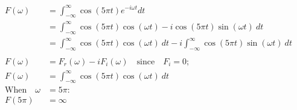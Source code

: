 \documentclass[preview]{standalone}
\begin{document}
\begin{align*}
F(\omega)&= \int_{-\infty}^{\infty} \cos{(5\pi t)}e^{-i\omega t} dt \\ &= \int_{-\infty}^{\infty} \cos{(5\pi t)}\cos{(\omega t)}-i\cos{(5\pi t)}\sin{(\omega t)} \ dt \\ &=\int_{-\infty}^{\infty} \cos{(5\pi t)}\cos{(\omega t)} \ dt - i\int_{-\infty}^{\infty} \cos{(5\pi t)}\sin{(\omega t)} \ dt \\ \\ F(\omega)&=F_{r}(\omega)-iF_{i}(\omega) \quad \textrm{since} \quad F_{i}=0; \\  F(\omega)&=\int_{-\infty}^{\infty} \cos{(5\pi t)}\cos{(\omega t)} \ dt \\  \textrm{When} \quad \omega&=5\pi : \\ F(5\pi)&=\infty
\end{align*}
\end{document}
